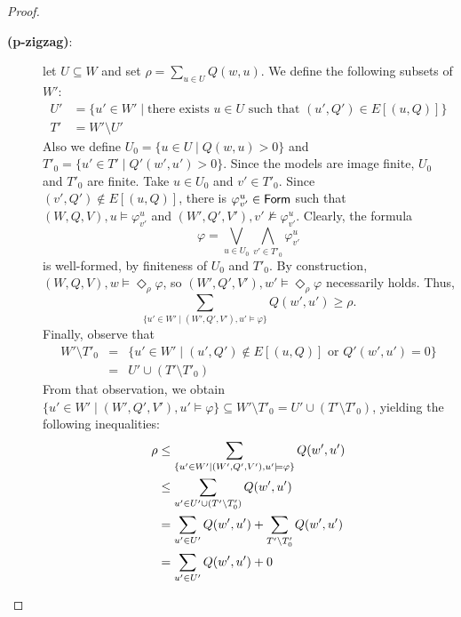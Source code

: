 \begin{proof}
\begin{description}
    \item[\textbf{(p-zigzag)}:] 
    let $U \subseteq W$ and set $\rho = \sum_{u \in U} {Q}(w,u)$. We define the following subsets of $W'$:
    \begin{align*}
          U' &= \{ u' \in W'\mid \text{there exists } u\in U \text{ such that } (u',{Q}')\in E[(u,{Q})] \} \\
          T' &= W' \setminus U' 
    \end{align*}
    Also we define $U_0 = \{u\in U \mid {Q}(w,u) > 0 \}$ and $T'_0 = \{u'\in T' \mid {Q}'(w',u') > 0\}$. Since the models are image finite, $U_0$ and $T'_0$ are finite. Take $u\in U_0$ and $v' \in T'_0$. Since $(v', {Q}') \notin E[(u,{Q})]$, there is $\varphi_{v'}^{u}\in\mathsf{Form} $ such that $(W,{Q},V) , u \models \varphi_{v'}^{u}$ and $(W',{Q}',V') , v' \not\models \varphi_{v'}^{u}$. Clearly, the formula
    \[
        \varphi = \bigvee_{u\in U_0} \bigwedge_{v'\in T'_0} \varphi_{v'}^{u}
    \]
    is well-formed, by finiteness of $U_0$ and $T'_0$. 
    By construction, $(W,{Q},V), w \models \Diamond_\rho \varphi$, so $(W',{Q}',V') , w' \models \Diamond_\rho \varphi$ necessarily holds. Thus,
    \[
        \sum_{\{u'\in W' \mid (W',{Q}',V'),u' \models \varphi \}}{Q}(w',u')\geq \rho.
    \]
    Finally, observe that 
    \[ 
        \begin{array}{lcl}            
            W'\setminus T'_0 & =& \{u'\in W' \mid  (u',{Q}')\notin E[(u,{Q})] \text{ or } {Q}'(w',u')=0\} \\
                            & =&  U' \cup (T'\setminus T'_0)
        \end{array}
    \]
    From that observation, we obtain $\{u' \in W' \mid (W',{Q}',V'),u' \models \varphi \} \subseteq W' \setminus T'_0 = U' \cup (T' \setminus T'_0) $, yielding the following inequalities:
    \begin{align*}
        \rho &\leq \sum_{\{u'\in W' \mid (W',{Q}',V'),u' \models \varphi \}}{Q}(w',u') \\
        &\leq \sum_{u'\in U'\cup (T'\setminus T'_0)}{Q}(w',u')\\
        &= \sum_{u'\in U'}{Q}(w',u') + \sum_{T'\setminus T'_0}{Q}(w',u')\\
        &= \sum_{u'\in U'}{Q}(w',u') + 0 \qedhere
    \end{align*}

\end{description}
\end{proof}
